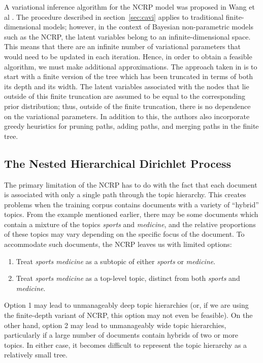 \documentclass{article}
\begin{document}
A variational inference algorithm for the NCRP model was proposed in Wang et al \cite{wang2009vi_ncrp}.
The procedure described in section~\ref{sec:cavi} applies to traditional finite-dimensional models;
however, in the context of Bayesian non-parametric models such as the NCRP, the latent variables belong to an infinite-dimensional space.
This means that there are an infinite number of variational parameters that would need to be updated in each iteration.
Hence, in order to obtain a feasible algorithm, we must make additional approximations.
The approach taken in \cite{wang2009vi_ncrp} is to start with a finite version of the tree which has been truncated in terms of both its depth and its width.
The latent variables associated with the nodes that lie outside of this finite truncation are assumed to be equal to the corresponding prior distribution; thus, outside of the finite truncation, there is no dependence on the variational parameters.
In addition to this, the authors also incorporate greedy heuristics for pruning paths, adding paths, and merging paths in the finite tree.

\subsection{The Nested Hierarchical Dirichlet Process}

The primary limitation of the NCRP has to do with the fact that each document is associated with only a single path through the topic hierarchy.
This creates problems when the training corpus contains documents with a variety of ``hybrid'' topics.
From the example mentioned earlier, there may be some documents which contain a mixture of the topics \emph{sports} and \emph{medicine}, and the relative proportions of these topics may vary depending on the specific focus of the document.
To accommodate such documents, the NCRP leaves us with limited options:
\begin{enumerate}
\item Treat \emph{sports medicine} as a subtopic of either \emph{sports} or \emph{medicine}.
\item Treat \emph{sports medicine} as a top-level topic, distinct from both \emph{sports} and \emph{medicine}.
\end{enumerate}
Option 1 may lead to unmanageably deep topic hierarchies (or, if we are using the finite-depth variant of NCRP, this option may not even be feasible).
On the other hand, option 2 may lead to unmanageably wide topic hierarchies, particularly if a large number of documents contain hybrids of two or more topics.
In either case, it becomes difficult to represent the topic hierarchy as a relatively small tree.
\end{document}
